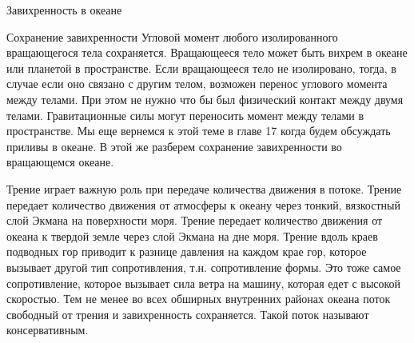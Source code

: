 \begin{chapter}{Завихренность в океане}
\begin{section}{Сохранение завихренности}
Угловой момент любого изолированного вращающегося тела
сохраняется. Вращающееся тело может быть вихрем в океане или планетой
в пространстве. Если вращающееся тело не изолировано, тогда, в случае
если оно связано с другим телом, возможен перенос углового момента
между телами. При этом не нужно что бы был физический контакт между
двумя телами. Гравитационные силы могут переносить момент между телами
в пространстве. Мы еще вернемся к этой теме в главе 17 когда будем
обсуждать приливы в океане. В этой же разберем сохранение
завихренности во вращающемся океане.
%

Трение играет важную роль при передаче количества движения в
потоке. Трение передает количество движения от атмосферы к океану
через тонкий, вязкостный слой Экмана на поверхности моря. Трение
передает количество движения от океана к твердой земле через слой
Экмана на дне моря. Трение вдоль краев подводных гор приводит к
разнице давления на каждом крае гор, которое вызывает другой тип
сопротивления, т.н. сопротивление формы. Это тоже самое сопротивление,
которое вызывает сила ветра на машину, которая едет с высокой
скоростью. Тем не менее во всех обширных внутренних районах океана
поток свободный от трения и завихренность сохраняется. Такой поток
называют консервативным.
%


\end{section}
\end{chapter}
